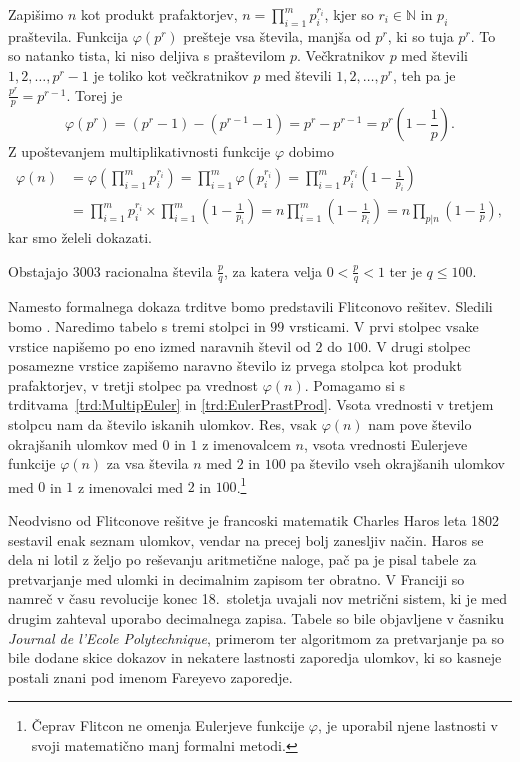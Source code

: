 \documentclass[mat1]{fmfdelo}
\begin{document}
\begin{dokaz}
Zapišimo $n$ kot produkt prafaktorjev, \(n=\prod_{i=1}^m p_i^{r_i}\), kjer so $r_i \in \mathbb{N}$ in $p_i$ praštevila.
Funkcija $\varphi(p^{r})$ prešteje vsa števila, manjša od $p^r$, ki so tuja $p^r$. To so natanko tista, ki niso deljiva s praštevilom $p$. Večkratnikov $p$ med števili $1, 2, \ldots, p^r-1$ je toliko kot večkratnikov $p$ med števili $1, 2, \ldots, p^r$, teh pa je \( \frac{p^r}{p} = p^{r-1}. \)
Torej je 
\[ \varphi(p^r) = (p^r - 1) - (p^{r-1} - 1) = p^r - p^{r-1} = p^r \left (1 - \frac{1}{p} \right). \] 
Z upoštevanjem multiplikativnosti funkcije $\varphi$ dobimo
%
\begin{align*}
 \varphi(n) 
 &= \varphi \left (\prod_{i=1}^m p_i^{r_i} \right ) = \prod_{i=1}^m \varphi (p_i^{r_i} ) = 
 \prod_{i=1}^m p_i^{r_i} \left (1 - \frac{1}{p_i} \right ) \\
 &= \prod_{i=1}^m p_i^{r_i} \times \prod_{i=1}^m \left (1 - \frac{1}{p_i} \right ) = 
 n \prod_{i=1}^m \left (1 - \frac{1}{p_i} \right ) = n \prod_{p|n} \left (1 - \frac{1}{p} \right ),
\end{align*}
kar smo želeli dokazati.
\end{dokaz}
%

\begin{trditev}
Obstajajo $3003$ racionalna števila $\frac{p}{q}$, za katera velja $0<\frac{p}{q}<1$ ter je $q \leq 100$.
\end{trditev}

Namesto formalnega dokaza trditve bomo predstavili Flitconovo rešitev. Sledili bomo \cite[poglavje 1.2]{fareyproject}. Naredimo tabelo s tremi stolpci in $99$ vrsticami. V prvi stolpec vsake vrstice napišemo po eno izmed naravnih števil od $2$ do $100$. V drugi stolpec posamezne vrstice zapišemo naravno število iz prvega stolpca kot produkt prafaktorjev, v tretji stolpec pa vrednost $\varphi(n)$. Pomagamo si s trditvama~\ref{trd:MultipEuler} in \ref{trd:EulerPrastProd}. Vsota vrednosti v tretjem stolpcu nam da število iskanih ulomkov. Res, vsak $\varphi(n)$ nam pove število okrajšanih ulomkov med $0$ in $1$ z imenovalcem $n$, vsota vrednosti Eulerjeve funkcije $\varphi(n)$ za vsa števila $n$ med $2$ in $100$ pa število vseh okrajšanih ulomkov med $0$ in $1$ z imenovalci med $2$ in $100$.\footnote{Čeprav Flitcon ne omenja Eulerjeve funkcije $\varphi$, je uporabil njene lastnosti v svoji matematično manj formalni metodi.}

Neodvisno od Flitconove rešitve je francoski matematik Charles Haros leta 1802 sestavil enak seznam ulomkov, vendar na precej bolj zanesljiv način. Haros se dela ni lotil z željo po reševanju aritmetične naloge, pač pa je pisal tabele za pretvarjanje med ulomki in decimalnim zapisom ter obratno. V Franciji so namreč v času revolucije konec 18.~stoletja uvajali nov metrični sistem, ki je med drugim zahteval uporabo decimalnega zapisa. Tabele so bile objavljene v časniku \emph{Journal de l'Ecole Polytechnique}, primerom ter algoritmom za pretvarjanje pa so bile dodane skice dokazov in nekatere lastnosti zaporedja ulomkov, ki so kasneje postali znani pod imenom Fareyevo zaporedje. 
\end{document}
